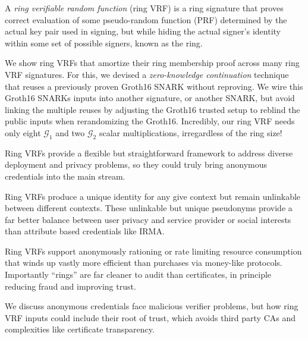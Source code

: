 A {\it ring verifiable random function} (ring VRF) is a ring signature
that proves correct evaluation of some pseudo-random function (PRF)
determined by the actual key pair used in signing, but while hiding
the actual signer's identity within some set of possible signers,
known as the ring.

\smallskip

We show ring VRFs that amortize their ring membership proof across many
ring VRF signatures.
%
For this, we devised a {\em zero-knowledge continuation} technique that
reuses a previously proven Groth16 SNARK without reproving.
We wire this Groth16 SNARKs inputs into another signature, or another SNARK, 
but avoid linking the multiple reuses by adjusting the Groth16 trusted setup
to reblind the public inputs when rerandomizing the Groth16.
%
Incredibly, our ring VRF needs only eight $\mathcal{G}_1$ and two
$\mathcal{G}_2$ scalar multiplications, irregardless of the ring size!

\smallskip

Ring VRFs provide a flexible  but straightforward framework to address
diverse deployment and privacy problems, so they could truly bring
anonymous credentials into the main stream.

Ring VRFs produce a unique identity for any give context but remain
unlinkable between different contexts.  These unlinkable but unique
pseudonyms provide a far better balance between user privacy and service
provider or social interests than attribute based credentials like IRMA.

Ring VRFs support anonymously rationing or rate limiting resource
consumption that winds up vastly more efficient than purchases via
money-like protocols.  Importantly ``rings'' are far cleaner to audit
than certificates, in principle reducing fraud and improving trust.

We discuss anonymous credentials face malicious verifier problems,
but how ring VRF inputs could include their root of trust, which
avoids third party CAs and complexities like certificate transparency.
